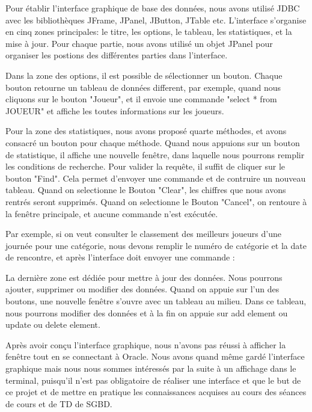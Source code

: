 Pour établir l'interface graphique de base des données, nous avons utilisé JDBC avec les bibliothèques JFrame, JPanel, JButton, JTable etc. L'interface s'organise en cinq zones principales: le titre, les options, le tableau, les statistiques, et la mise à jour. Pour chaque partie, nous avons utilisé un objet JPanel pour organiser les postions des différentes parties dans l'interface.

Dans la zone des options, il est possible de sélectionner un bouton. Chaque bouton retourne un tableau de données different, par exemple, quand nous cliquons sur le bouton "Joueur", et il envoie une commande "select * from JOUEUR" et affiche les toutes informations sur les joueurs.


Pour la zone des statistiques, nous avons proposé quarte méthodes, et avons consacré un bouton pour chaque méthode. Quand nous appuions sur un bouton de statistique, il affiche une nouvelle fenêtre, dans laquelle nous pourrons remplir les conditions de recherche. Pour valider la requête, il suffit de cliquer sur le bouton "Find". Cela permet d'envoyer une commande et de contruire un nouveau tableau. Quand on selectionne le Bouton "Clear", les chiffres que nous avons rentrés seront supprimés. Quand on selectionne le Bouton "Cancel", on rentoure à la fenêtre principale, et aucune commande n'est exécutée.


Par exemple, si on veut consulter le classement des meilleurs joueurs d'une journée pour une catégorie, nous devons remplir le numéro de catégorie et la date de rencontre, et après l'interface doit envoyer une commande :


La dernière zone est dédiée pour mettre à jour des données. Nous pourrons ajouter, supprimer ou modifier des données. Quand on appuie sur l'un des boutons, une nouvelle fenêtre s'ouvre avec un tableau au milieu. Dans ce tableau, nous pourrons modifier des données et à la fin on appuie sur add element ou update ou delete element.


Après avoir conçu l'interface graphique, nous n'avons pas réussi à afficher la fenêtre tout en se connectant à Oracle. Nous avons quand même gardé l'interface graphique mais nous nous sommes intéressés par la suite à un affichage dans le terminal, puisqu'il n'est pas obligatoire de réaliser une interface et que le but de ce projet et de mettre en pratique les connaissances acquises au cours des séances de cours et de TD de SGBD. 

